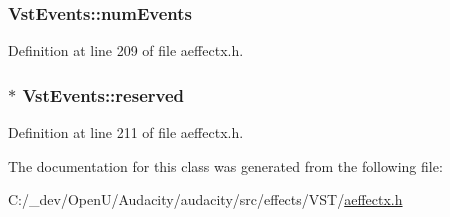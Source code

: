 \subsubsection[{\texorpdfstring{num\+Events}{numEvents}}]{ Vst\+Events\+::num\+Events}\hypertarget{class_vst_events_a6ef57a656663db82f9e42565b4a1ef3c}{}\label{class_vst_events_a6ef57a656663db82f9e42565b4a1ef3c}


Definition at line 209 of file aeffectx.\+h.

\subsubsection[{\texorpdfstring{reserved}{reserved}}]{$\ast$ Vst\+Events\+::reserved}\hypertarget{class_vst_events_a9d3212cc080d0e21a9b4bc275f6c0f7f}{}\label{class_vst_events_a9d3212cc080d0e21a9b4bc275f6c0f7f}


Definition at line 211 of file aeffectx.\+h.



The documentation for this class was generated from the following file\+:\begin{DoxyCompactItemize}
\item 
C\+:/\+\_\+dev/\+Open\+U/\+Audacity/audacity/src/effects/\+V\+S\+T/\hyperlink{aeffectx_8h}{aeffectx.\+h}\end{DoxyCompactItemize}
